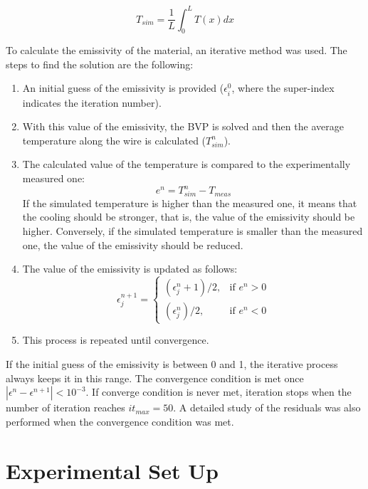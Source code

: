 \begin{equation}
    T_{sim} = \frac{1}{L}\int_{0}^{L} T(x) dx
\end{equation}

To calculate the emissivity of the material, an iterative method was used. The steps to find the solution are the following: 

\begin{enumerate}
    \item An initial guess of the emissivity is provided ($\epsilon_i^0$, where the super-index indicates the iteration number).
    \item With this value of the emissivity, the BVP is solved and then the average temperature along the wire is calculated ($T^{n}_{sim}$). 
    \item The calculated value of the temperature is compared to the experimentally measured one: 
    \begin{equation}
        e^{n} = T^{n}_{sim} - T_{meas}
    \end{equation}
    If the simulated temperature is higher than the measured one, it means that the cooling should be stronger, that is, the value of the emissivity should be higher. Conversely, if the simulated temperature is smaller than the measured one, the value of the emissivity should be reduced. 

    \item The value of the emissivity is updated as follows: 
        \begin{equation}
               \epsilon^{n+1}_j = \begin{cases}  (\epsilon^n_j + 1)/2, & \mbox{if } e^n > 0\\ (\epsilon^n_j)/2, & \mbox{if } e^n < 0 \end{cases}
         \end{equation}
    \item This process is repeated until convergence.
\end{enumerate}

If the initial guess of the emissivity is between 0 and 1, the iterative process always keeps it in this range. The convergence condition is met once $\left| \epsilon^{n} - \epsilon^{n+1}\right| < 10^{-3}$. If converge condition is never met, iteration stops when the number of iteration reaches $it_{max} = 50$. A detailed study of the residuals was also performed when the convergence condition was met.  

\section{Experimental Set Up}

